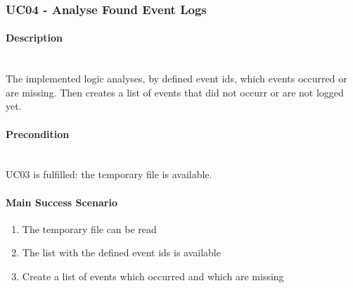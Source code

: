 \subsubsection{UC04 - Analyse Found Event Logs}\label{UC04}
\begin{tcolorbox}
    \paragraph{Description} \ \\
    The implemented logic analyses, by defined event ids, which events occurred or are missing. Then creates a list of events that did not occurr or are not logged yet.
    \ \\
    \paragraph{Precondition} \ \\
    UC03 is fulfilled: the temporary file is available.
    \ \\
    \paragraph{Main Success Scenario} 
    \begin{enumerate}
        \item The temporary file can be read
        \item The list with the defined event ids is available
        \item Create a list of events which occurred and which are missing
    \end{enumerate}   
\end{tcolorbox}

